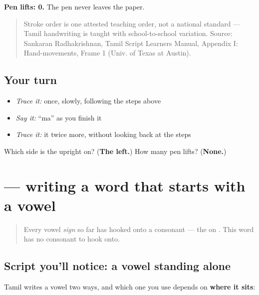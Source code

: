 \textbf{Pen lifts: 0.} The pen never leaves the paper.

\begin{quote}
Stroke order is one attested teaching order, not a national standard — Tamil handwriting is taught with school-to-school variation. Source: Sankaran Radhakrishnan, Tamil Script Learners Manual, Appendix I: Hand-movements, Frame 1 (Univ. of Texas at Austin).
\end{quote}

\subsection*{Your turn}
\begin{itemize}
\raggedright
  \item \emph{Trace it:}  once, slowly, following the steps above
  \item \emph{Say it:} \textquotedblleft{}ma\textquotedblright{} as you finish it
  \item \emph{Trace it:} it twice more, without looking back at the steps
\end{itemize}

\begin{tcolorbox}[breakable,colback=teal!4,colframe=teal!35!black,title={Before you move on}]
Which side is the upright on? (\textbf{The left.}) How many pen lifts? (\textbf{None.})
\end{tcolorbox}
\section[\texorpdfstring{\ta{ஆம்} (ām)}{ஆம் (ām)}]{ — writing a word that starts with a vowel}

\label{lesson:TA-W05-write-aam}



\begin{quote}
Every vowel \emph{sign} so far has hooked onto a consonant — the  on \textbf{}. This word has no consonant to hook onto.
\end{quote}

\subsection*{Script you'll notice: a vowel standing alone}

Tamil writes a vowel two ways, and which one you use depends on \textbf{where it sits}:

